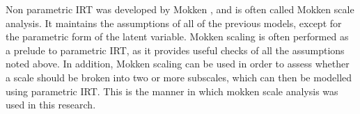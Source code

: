 Non parametric IRT was developed by Mokken \cite{mokken1997nonparametric}, and is often called Mokken scale analysis\cite{van2007mokken}. It maintains the assumptions of all of the previous models, except for the parametric form of the latent variable. Mokken scaling is often performed as a prelude to parametric IRT, as it provides useful checks of all the assumptions noted above. In addition, Mokken scaling can be used in order to assess whether a scale should be broken into two or more subscales, which can then be modelled using parametric IRT. This is the manner in which mokken scale analysis was used in this research. 

\label{sec:irt-models}

\label{sec:irt-models}


